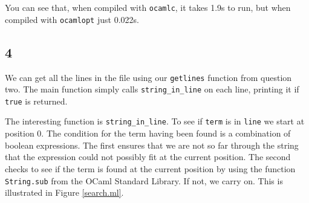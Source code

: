 \documentclass[]{book}
\begin{document}
\noindent You can see that, when compiled with \texttt{ocamlc}, it takes 1.9s to run, but when compiled with \texttt{ocamlopt} just 0.022s.

\subsection*{4}
We can get all the lines in the file using our \texttt{getlines} function from question two. The main function simply calls \texttt{string\_in\_line} on each line, printing it if \texttt{true} is returned.

The interesting function is \texttt{string\_in\_line}. To see if \texttt{term} is in \texttt{line} we start at position 0. The condition for the term having been found is a combination of boolean expressions. The first ensures that we are not so far through the string that the expression could not possibly fit at the current position. The second checks to see if the term is found at the current position by using the function \texttt{String.sub} from the OCaml Standard Library. If not, we carry on. This is illustrated in Figure \ref{search.ml}.
\end{document}
